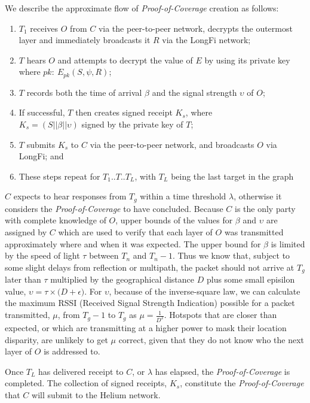 \documentclass[10pt, nonatbib, nocopyrightspace, reprint]{sigplanconf}
\begin{document}
We describe the approximate flow of \emph{Proof-of-Coverage} creation as follows:

\begin{enumerate}
  \item $T_1$ receives $O$ from $C$ via the peer-to-peer network, decrypts the outermost layer and immediately broadcasts it $R$ via the LongFi network;
  \item $T$ hears $O$ and attempts to decrypt the value of $E$ by using its private key where $pk:\ E_{pk}\left(S, \psi, R\right)$;
  \item $T$ records both the time of arrival $\beta$ and the signal strength $\upsilon$ of $O$;
  \item If successful, $T$ then creates signed receipt $K_s$, where \\${K_s = \left(S || \beta || \upsilon\right)}$ signed by the private key of $T$;
  \item $T$ submits $K_s$ to $C$ via the peer-to-peer network, and broadcasts $O$ via LongFi; and
  \item These steps repeat for $T_1$..$T$..$T_L$, with $T_L$ being the last target in the graph
\end{enumerate}

$C$ expects to hear responses from $T_g$ within a time threshold $\lambda$, otherwise it considers the \emph{Proof-of-Coverage} to have concluded. Because $C$ is the only party with complete knowledge of $O$, upper bounds of the values for $\beta$ and $\upsilon$ are assigned by $C$ which are used to verify that each layer of $O$ was transmitted approximately where and when it was expected. The upper bound for $\beta$ is limited by the speed of light $\tau$ between $T_n$ and $T_n-1$. Thus we know that, subject to some slight delays from reflection or multipath, the packet should not arrive at $T_g$ later than $\tau$ multiplied by the geographical distance $D$ plus some small episilon value, $\upsilon = \tau \times \Big(D + \epsilon\Big)$. For $\upsilon$, because of the inverse-square law, we can calculate the maximum RSSI (Received Signal Strength Indication) possible for a packet transmitted, $\mu$, from $T_g-1$ to $T_g$ as $\mu = \frac{1}{D^2}$. Hotspots that are closer than expected, or which are transmitting at a higher power to mask their location disparity, are unlikely to get $\mu$ correct, given that they do not know who the next layer of $O$ is addressed to.

Once $T_L$ has delivered receipt to $C$, or $\lambda$ has elapsed, the \emph{Proof-of-Coverage} is completed. The collection of signed receipts, $K_s$, constitute the \emph{Proof-of-Coverage} that $C$ will submit to the Helium network.
\end{document}
